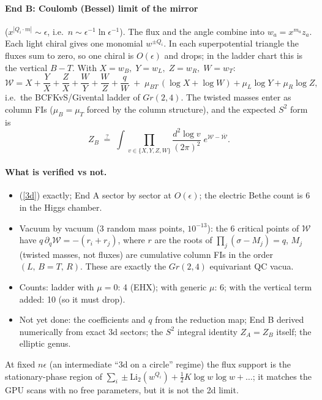 \documentclass[11pt]{article}
\begin{document}
\paragraph{End B: Coulomb (Bessel) limit of the mirror} ($x^{|Q_i\cdot m|}\sim\epsilon$, i.e.\ $n\sim\epsilon^{-1}\ln\epsilon^{-1}$). The flux and the angle combine into $w_a=x^{m_a}z_a$. Each light chiral gives one monomial $w^{\pm Q_i}$. In each superpotential triangle the fluxes sum to zero, so one chiral is $O(\epsilon)$ and drops; in the ladder chart this is the vertical $B\!-\!T$. With $X=w_B,\;Y=w_L,\;Z=w_R,\;W=w_T$:
\begin{equation}
\mathcal W=X+\frac{Y}{X}+\frac{Z}{X}+\frac{W}{Y}+\frac{W}{Z}+\frac{q}{W}
\;+\;\mu_{BT}\,(\log X+\log W)+\mu_L\log Y+\mu_R\log Z ,
\end{equation}
i.e.\ the BCFKvS/Givental ladder of $Gr(2,4)$. The twisted masses enter as column FIs ($\mu_B=\mu_T$ forced by the column structure), and the expected $S^2$ form is
\begin{equation}
Z_{B}\;\stackrel{?}{=}\;\int\prod_{v\in\{X,Y,Z,W\}}\frac{d^2\log v}{(2\pi)^2}\;e^{\mathcal W-\overline{\mathcal W}} .
\end{equation}

\paragraph{What is verified vs not.}
\begin{itemize}\itemsep0pt
\item[\checkmark] (\ref{3d}) exactly; End A sector by sector at $O(\epsilon)$; the electric Bethe count is $6$ in the Higgs chamber.
\item[\checkmark] Vacuum by vacuum (3 random mass points, $10^{-13}$): the 6 critical points of $\mathcal W$ have $q\,\partial_q\mathcal W=-(r_i+r_j)$, where $r$ are the roots of $\prod_j(\sigma-M_j)=q$, $M_j$ (twisted masses, not fluxes) are cumulative column FIs in the order $(L,\,B{=}T,\,R)$. These are exactly the $Gr(2,4)$ equivariant QC vacua.
\item[\checkmark] Counts: ladder with $\mu=0$: 4 (EHX); with generic $\mu$: 6; with the vertical term added: 10 (so it must drop).
\item[$\times$] Not yet done: the coefficients and $q$ from the reduction map; End B derived numerically from exact 3d sectors; the $S^2$ integral identity $Z_A=Z_B$ itself; the elliptic genus.
\end{itemize}
At fixed $n\epsilon$ (an intermediate ``3d on a circle'' regime) the flux support is the stationary-phase region of $\sum_i\pm\mathrm{Li}_2(w^{Q_i})+\tfrac12K\log w\log w+\dots$; it matches the GPU scans with no free parameters, but it is not the 2d limit.
\end{document}
